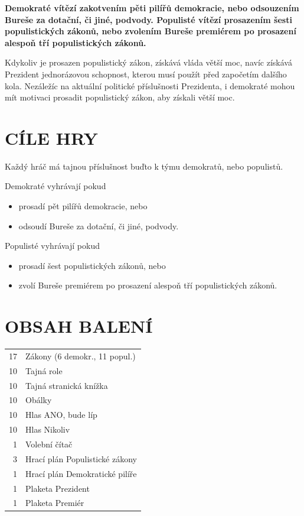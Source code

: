 \documentclass{article}
\begin{document}
    \textbf{Demokraté vítězí zakotvením pěti pi\-lí\-řů demokracie, nebo odsouzením Bureše za dotační, či jiné, podvody. Populisté ví\-tě\-zí prosazením šesti populistických zá\-ko\-nů, nebo zvolením Bureše premiérem po prosazení alespoň tří populistických zákonů.}

    Kdykoliv je prosazen populistický zákon, zís\-ká\-vá vláda větší moc, navíc získává Prezident jed\-no\-rá\-zo\-vou schopnost, kterou musí použít před za\-po\-če\-tím dalšího kola. Nezáležíc na aktuální politické pří\-sluš\-nos\-ti Prezidenta, i demokraté mohou mít motivaci prosadit populistický zákon, aby získali větší moc.


\section*{CÍLE HRY}

    Každý hráč má tajnou příslušnost buďto k týmu demokratů, nebo populistů.

    Demokraté vyhrávají pokud
    \begin{itemize}
        \item prosadí pět pilířů demokracie, nebo
        \item odsoudí Bureše za dotační, či jiné, podvody.
    \end{itemize}
    Populisté vyhrávají pokud
    \begin{itemize}
        \item prosadí šest populistických zákonů, nebo
        \item zvolí Bureše premiérem po prosazení alespoň tří po\-pu\-lis\-tic\-kých zákonů.
    \end{itemize}


\section*{OBSAH BALENÍ}

    \begin{tabular}{r@{~\ldots~}l} %
    17 & Zákony (6 demokr., 11 popul.) \\
    10 & Tajná role \\
    10 & Tajná stranická knížka \\
    10 & Obálky \\
    10 & Hlas ANO, bude líp \\
    10 & Hlas Nikoliv \\
    1 & Volební čítač \\
    3 & Hrací plán Populistické zákony \\
    1 & Hrací plán Demokratické pilíře \\
    1 & Plaketa Prezident \\
    1 & Plaketa Premiér
    \end{tabular}
\end{document}
